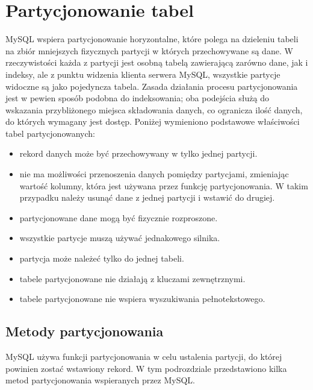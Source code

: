 \section{Partycjonowanie tabel}
MySQL wspiera partycjonowanie horyzontalne, które polega na dzieleniu tabeli na zbiór mniejszych fizycznych partycji w których przechowywane są dane. W rzeczywistości każda z partycji jest osobną tabelą zawierającą zarówno dane, jak i indeksy, ale z punktu widzenia klienta serwera MySQL, wszystkie partycje widoczne są jako pojedyncza tabela. Zasada działania procesu partycjonowania jest w pewien sposób podobna do indeksowania; oba podejścia służą do wskazania przybliżonego miejsca składowania danych, co ogranicza ilość danych, do których wymagany jest dostęp.
Poniżej wymieniono podstawowe właściwości tabel partycjonowanych:
\begin{itemize}
	\item rekord danych może być przechowywany w tylko jednej partycji.
	\item nie ma możliwości przenoszenia danych pomiędzy partycjami, zmieniając wartość kolumny, która jest używana przez funkcję partycjonowania. W takim przypadku należy usunąć dane z jednej partycji i wstawić do drugiej.
	\item partycjonowane dane mogą być fizycznie rozproszone.
	\item wszystkie partycje muszą używać jednakowego silnika.
	\item partycja może należeć tylko do jednej tabeli.
	\item tabele partycjonowane nie działają z kluczami zewnętrznymi.
	\item tabele partycjonowane nie wspiera wyszukiwania pełnotekstowego.
\end{itemize} 

\subsection{Metody partycjonowania}
MySQL używa funkcji partycjonowania w celu ustalenia partycji, do której powinien zostać wstawiony rekord. W tym podrozdziale przedstawiono kilka metod partycjonowania wspieranych przez MySQL.

